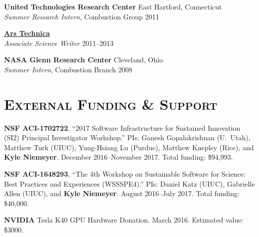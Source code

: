 \documentclass[margin,line,11pt]{res}
\begin{document}
\begin{resume}
\textbf{United Technologies Research Center} \hfill East Hartford, Connecticut \\
\emph{Summer Research Intern}, Combustion Group \hfill 2011

\textbf{\href{http://arstechnica.com/}{Ars Technica}} \\
\emph{Associate Science Writer} \hfill 2011--2013

\textbf{NASA Glenn Research Center} \hfill Cleveland, Ohio \\
\emph{Summer Intern}, Combustion Branch \hfill 2008

\section{\textsc{External Funding \& Support}}

\textbf{NSF ACI-1702722}, ``2017 Software Infrastructure for Sustained Innovation (SI2) Principal Investigator Workshop.''
PIs: Ganesh Gopalakrishnan (U.~Utah), Matthew Turk (UIUC), Yung-Hsiang Lu (Purdue), Matthew Knepley (Rice), and \textbf{Kyle Niemeyer}.
December 2016--November 2017.
Total funding: \$94,993.

\textbf{NSF ACI-1648293}, ``The 4th Workshop on Sustainable Software for Science: Best Practices and Experiences (WSSSPE4).''
PIs: Daniel Katz (UIUC), Gabrielle Allen (UIUC), and \textbf{Kyle Niemeyer}.
August 2016--July 2017.
Total funding: \$40,000.

\textbf{NVIDIA} Tesla K40 GPU Hardware Donation. March 2016. Estimated value: \$3000.


\end{resume}
\end{document}
